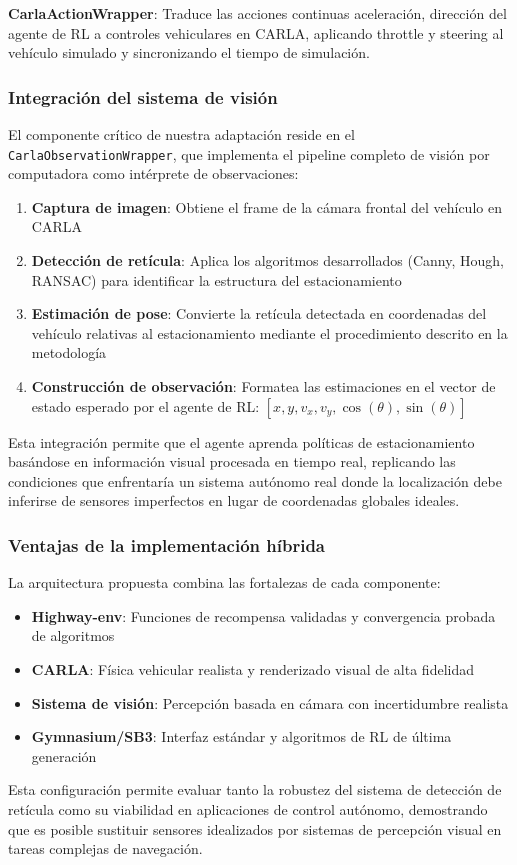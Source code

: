 \noindent
\textbf{CarlaActionWrapper}: Traduce las acciones continuas 
aceleración, dirección del agente de RL
a controles vehiculares en CARLA, aplicando throttle y steering al vehículo simulado 
y sincronizando
el tiempo de simulación.

\subsubsection{Integración del sistema de visión}
\noindent
El componente crítico de nuestra adaptación reside en el \texttt{CarlaObservationWrapper}, que implementa
el pipeline completo de visión por computadora como intérprete de observaciones:

\begin{enumerate}
    \item \textbf{Captura de imagen}: Obtiene el frame de la cámara frontal del vehículo en CARLA
    \item \textbf{Detección de retícula}: Aplica los algoritmos desarrollados (Canny, Hough, RANSAC)
    para identificar la estructura del estacionamiento
    \item \textbf{Estimación de pose}: Convierte la retícula detectada en coordenadas del vehículo
    relativas al estacionamiento mediante el procedimiento descrito en la metodología
    \item \textbf{Construcción de observación}: Formatea las estimaciones en el vector de estado
    esperado por el agente de RL: $[x, y, v_x, v_y, \cos(\theta), \sin(\theta)]$
\end{enumerate}

\noindent
Esta integración permite que el agente aprenda políticas de estacionamiento basándose en información
visual procesada en tiempo real, replicando las condiciones que enfrentaría un sistema autónomo real
donde la localización debe inferirse de sensores imperfectos en lugar de coordenadas globales ideales.

\subsubsection{Ventajas de la implementación híbrida}
\noindent
La arquitectura propuesta combina las fortalezas de cada componente:
\begin{itemize}
    \item \textbf{Highway-env}: Funciones de recompensa validadas y convergencia probada de algoritmos
    \item \textbf{CARLA}: Física vehicular realista y renderizado visual de alta fidelidad
    \item \textbf{Sistema de visión}: Percepción basada en cámara con incertidumbre realista
    \item \textbf{Gymnasium/SB3}: Interfaz estándar y algoritmos de RL de última generación
\end{itemize}

\noindent
Esta configuración permite evaluar tanto la robustez del sistema de detección de retícula
como su viabilidad en aplicaciones de control autónomo, demostrando que es posible sustituir
sensores idealizados por sistemas de percepción visual en tareas complejas de navegación.
